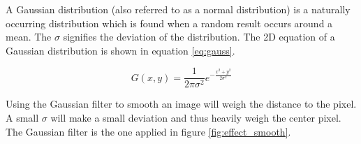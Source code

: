 A Gaussian distribution (also referred to as a normal distribution) is a naturally occurring distribution which is found when a random result occurs around a mean. 
The $\sigma$ signifies the deviation of the distribution. 
The 2D equation of a Gaussian distribution is shown in equation \ref{eq:gauss}. 

\begin{equation}
G(x,y) = \frac{1}{2\pi \sigma^2} e^{- \frac{x^2+y^2}{2\sigma^2}} \label{eq:gauss}
\end{equation}

Using the Gaussian filter to smooth an image will weigh the distance to the pixel.
A small $\sigma$ will make a small deviation and thus heavily weigh the center pixel.
The Gaussian filter is the one applied in figure \ref{fig:effect_smooth}.



